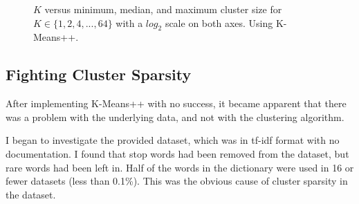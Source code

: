 \documentclass{article} %
\begin{document}
\begin{figure}[h]
\begin{center}
\end{center}
\caption{$K$ versus minimum, median, and maximum cluster size for $K \in \{1,2,4,...,64\}$ with a $log_{2}$ scale on both axes. Using K-Means++.}
\end{figure}

\subsection{Fighting Cluster Sparsity}

After implementing K-Means++ with no success, it became apparent that there was a problem with the underlying data, and not with the clustering algorithm. 

I began to investigate the provided dataset, which was in tf-idf format with no documentation. I found that stop words had been removed from the dataset, but rare words had been left in. Half of the words in the dictionary were used in 16 or fewer datasets (less than 0.1\%). This was the obvious cause of cluster sparsity in the dataset. 
\end{document}
